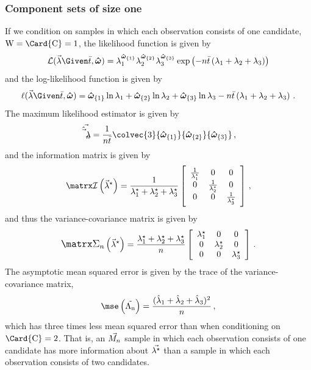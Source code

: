 \documentclass[../main.tex]{subfiles}
\begin{document}
\subsubsection{Component sets of size one}
If we condition on samples in which each observation consists of one candidate, $\RV{W} = \Card{\rvcand} = 1$, the likelihood function is given by
\begin{equation}
    \likelihood(\vec\lambda \Given \bar{t}, \cntsymb) = \lambda_1^{\cnt{1}} \lambda_2^{\cnt{2}} \lambda_3^{\cnt{3}} \exp\left(-n \bar{t} \left(\lambda_1 + \lambda_2 + \lambda_3\right)\right)
\end{equation}
and the log-likelihood function is given by
\begin{equation}
    \ell(\vec\lambda \Given \bar{t}, \cntsymb) = \cnt{1} \ln\lambda_1 + \cnt{2} \ln\lambda_2 + \cnt{3} \ln\lambda_3 - n \bar{t}\left(\lambda_1 + \lambda_2 + \lambda_3\right)\,.
\end{equation}
The maximum likelihood estimator is given by
\begin{equation}
    \expomle = \frac{1}{n \bar{t}} \colvec{3}
        {\cnt{1}}
        {\cnt{2}}
        {\cnt{3}}\,,
\end{equation}
and the information matrix is given by
\begin{equation}
\infomatrx \left ( \tparam{\vec\lambda} \right ) =
\frac{1}{\tparam{\lambda}_1 + \tparam{\lambda}_2 + \tparam{\lambda}_3}
\left[
\begin{array}{ccc}
    \frac{1}{\tparam{\lambda}_1} & 0                            & 0\\
    0                            & \frac{1}{\tparam{\lambda}_2} & 0\\
    0                            & 0                            & \frac{1}{\tparam{\lambda}_3}
\end{array}
\right]\,,
\end{equation}
and thus the variance-covariance matrix is given by
\begin{equation}
    \cov\left(\tparam{\vec\lambda}\right) = \frac{\tparam{\lambda}_1+\tparam{\lambda}_2+\tparam{\lambda}_3}{n}
    \left[
    \begin{array}{ccc}
        \tparam{\lambda}_1 & 0                  & 0\\
        0                  & \tparam{\lambda}_2 & 0\\
        0                  & 0                  & \tparam{\lambda}_3
    \end{array}
\right]\,.
\end{equation}
The asymptotic mean squared error is given by the trace of the variance-covariance matrix,
\begin{equation}
    \mse\left(\sampdexpo\right) = \frac{(\estimator{\lambda}_1 +  \estimator{\lambda}_2 +  \estimator{\lambda}_3)^2}{n}\,,
\end{equation}
which has three times less mean squared error than when conditioning on $\Card{\rvcand} = 2$. That is, an $\vec{M_n}$ sample in which each observation consists of one candidate has more information about $\vec{{\lambda}^{\star}}$ than a sample in which each observation consists of two candidates.
\end{document}
